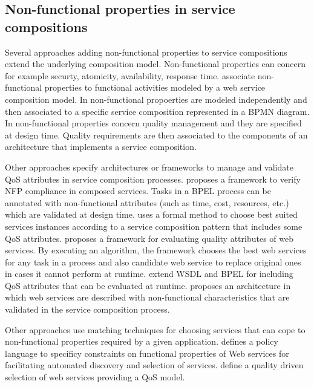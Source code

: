 \subsection{Non-functional properties in service compositions}

Several approaches adding non-functional properties to service compositions extend the underlying composition model. Non-functional properties can concern for example securty, atomicity, availability, response time.
\cite{CholletL09,SchmelingCM11}  associate non-functional  properties  to functional activities  modeled by a web service composition model. In \cite{chmelingCM11} 
non-functional propoerties are   modeled independently and then associated to   a specific service composition represented in a BPMN diagram. 
In \cite{OvaskaEHPA10} non-functional properties concern  quality management and they are specified at design time. Quality requirements  are then associated to the components of an architecture that implements a service composition. 


Other approaches specify architectures or frameworks to manage and validate QoS attributes in service composition processes. 
\cite{XiaoCZBOLH08} proposes a framework to verify NFP compliance in composed services. Tasks in a BPEL process can be annotated with non-functional attributes (such as time, cost, resources, etc.) which are validated at design time. 
\cite{SchmelingCM11} uses a formal method  to choose best suited services instances according to a service composition pattern that includes some QoS attributes. 
 \cite{Babamir2010} proposes a framework for evaluating quality attributes of web services. By executing an algorithm, the framework  chooses the best web services for any task in a process and also candidate web service to replace original ones in cases it cannot perform at runtime. \cite{DAmbrogio06,Liu20121080}  extend  WSDL and BPEL   for including  QoS attributes that can be evaluated at runtime.
 \cite{Karunamurthy2012787} proposes an architecture in which web services are described with non-functional characteristics that are validated in the service composition process.

Other approaches \cite{JeongCL09,Kamalabad2012,MohantyRP10} use matching techniques for choosing services that can cope to non-functional properties required by a given application.
\cite{AgarwalLS09} defines a policy language to specificy constraints on functional  properties of Web services for facilitating automated discovery and selection of services. 
\cite{Yeom2006} define a quality driven selection of web services providing a QoS model.



